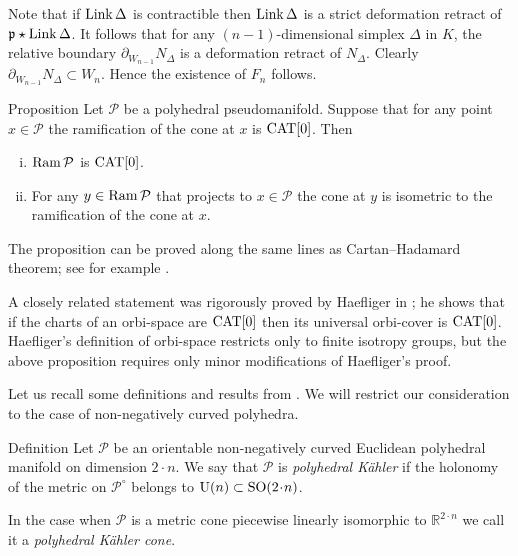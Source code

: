 \documentclass{compositio}
\begin{document}
Note that if $\mathop{\rm Link}\Delta$ is contractible
then  $\mathop{\rm Link}\Delta$ is a strict deformation retract of $\mathfrak{p}\star\mathop{\rm Link}\Delta$.
It follows that for any $(n-1)$-dimensional simplex $\Delta$ in $K$,
the relative boundary  $\partial_{W_{n-1}}N_\Delta$
is a deformation retract of $N_\Delta$.
Clearly $\partial_{W_{n-1}}N_\Delta\subset W_n$.
Hence the existence of $F_n$ follows.
\qeds


\begin{thm}{Proposition}\label{orbianalog}
Let $\mathcal P$ be a polyhedral pseudomanifold.
Suppose that for any point $x\in \mathcal P$ the ramification of the cone at $x$ is $\mathrm{CAT}[0]$.
Then
\begin{enumerate}[(i)]
\item\label{orbianalog:i} $\mathop{\rm Ram}\nolimits \mathcal P$ is $\mathrm{CAT}[0]$.
\item\label{orbianalog:ii} For any $y\in \mathop{\rm Ram}\nolimits \mathcal P$ that projects to $x\in \mathcal P$
the cone at $y$ is isometric to the ramification of the cone at $x$.
\end{enumerate}
\end{thm}


The proposition can be proved along the same lines as Cartan--Hadamard theorem;
see for example \cite{akp}.

A closely related statement was rigorously proved by Haefliger in \cite{haefliger};
he shows that if the charts of an orbi-space are $\mathrm{CAT}[0]$
then its universal orbi-cover is $\mathrm{CAT}[0]$.
Haefliger's definition of orbi-space restricts only to finite isotropy groups, but the above proposition requires only minor modifications of  Haefliger's  proof.

Let us recall some definitions and results
from \cite{panov}.
We will restrict our consideration to the case of non-negatively curved polyhedra.

\begin{thm}{Definition}\label{PKdefinition} Let $\mathcal{P}$ be an orientable non-negatively curved Euclidean
polyhedral manifold on dimension $2{\cdot}n$.
We say that  $\mathcal{P}$ is
\emph{polyhedral K\"ahler} if the holonomy of the metric
on $\mathcal{P}^\circ$ belongs to
$\mathrm{U}(n)\subset \SO(2\cdot n)$.

In the case  when $\mathcal{P}$ is a metric cone
piecewise linearly isomorphic to $\mathbb R^{2\cdot n}$ we call it a \emph{polyhedral K\"ahler cone}.
\end{thm}
\end{document}
